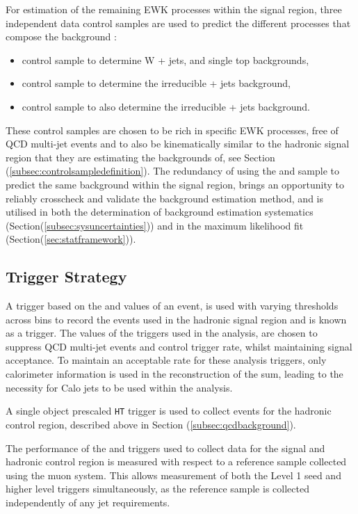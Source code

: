 For estimation of the remaining \ac{EWK} processes within the signal region, three independent data control samples are used to predict the different processes that compose the background :

\begin{itemize}
\item \mupjets control sample to determine W + jets, \ttbar and single top backgrounds,
\item \gpjets control sample to determine the irreducible \zinv + jets background,
\item \dimupjets control sample to also determine the irreducible \zinv + jets background.
\end{itemize}

These control samples are chosen to be rich in specific \ac{EWK} processes, free of QCD multi-jet events and to also be kinematically similar to the hadronic signal region that they are estimating the backgrounds of, see Section (\ref{subsec:controlsampledefinition}). The redundancy of using the \gpjets and \dimupjets sample to predict the same background within the signal region, brings an opportunity to reliably crosscheck and validate the background estimation method, and is utilised in both the determination of background estimation systematics (Section(\ref{subsec:sysuncertainties})) and in the maximum likelihood fit (Section(\ref{sec:statframework})).

\subsection{Trigger Strategy}
\label{subsec:triggerstrategy}

A trigger based on the \theht and \alphat values of an event, is used with varying thresholds across \theht bins to record the events used in the hadronic signal region and is known as a  \htalphat trigger. The \alphat values of the \htalphat triggers used in the analysis, are chosen to suppress QCD multi-jet events and control trigger rate, whilst maintaining signal acceptance. To maintain an acceptable rate for these analysis triggers, only calorimeter information is used in the reconstruction of the \theht sum, leading to the necessity for Calo jets to be used within the analysis. 

A single object prescaled \texttt{HT} trigger is used to collect events for the hadronic control region, described above in Section (\ref{subsec:qcdbackground}).

The performance of the \alphat and \theht triggers used to collect data for the signal and hadronic control region is measured with respect to a reference sample collected using the muon system. This allows measurement of both the Level 1 seed and higher level triggers simultaneously, as the reference sample is collected independently of any jet requirements. 


